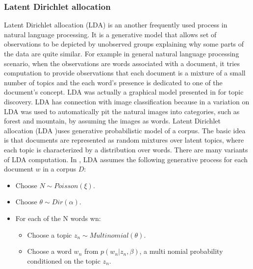 \subsubsection{Latent Dirichlet allocation}
Latent Dirichlet allocation (LDA) is an another frequently used process in natural language processing. It is a generative model that allows set of observations to be depicted by unobserved groups explaining why some parts of the data are quite similar. For example in general natural language processing scenario, when the observations are words associated with a document, it tries computation to provide observations that each document is a mixture of a small number of topics and the each word's presence is dedicated to one of the document's concept. LDA was actually a graphical model presented in \cite{Blei} for topic discovery.
LDA has connection with image classification because in \cite{Li} a variation on LDA was used to automatically pit the natural images into categories, such as  forest and mountain, by assuming the images as words. 
	Latent Dirichlet allocation (LDA )uses generative probabilistic model of a corpus. The basic idea is that documents are represented as random mixtures over latent topics, where each topic is characterized by a distribution over words. There are many variants of LDA computation. In \cite{Blei}, LDA assumes the following generative process for each document $w$ in a corpus $D$:
	\begin{itemize}
	\item Choose $N \sim Poisson(\xi)$.
	\item Choose $\theta \sim Dir(\alpha)$.
	\item For each of the N words wn:
	\begin{itemize}
		\item  Choose a topic $z_n \sim Multinomial(\theta).$
		\item Choose a word $w_n$ from $p(w_n | z_n,\beta)$, a multi nomial probability conditioned on the topic $z_n$.
	\end{itemize}
	\end{itemize}
